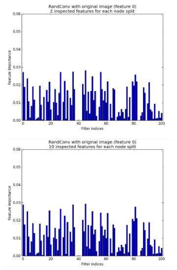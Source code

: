 \documentclass[a4paper]{report}
\begin{document}
	\begin{figure}
		\begin{subfigure}{.5\textwidth}
			\centering
			\includegraphics[width=1.\linewidth]{images/FInmin2.png}
			\caption{\label{fig:FInmin2}}
		\end{subfigure}%
		\begin{subfigure}{.5\textwidth}
			\centering
			\includegraphics[width=1.\linewidth]{images/FInmin10.png}
			\caption{\label{fig:FInmin10}}
		\end{subfigure}
		\begin{subfigure}{.5\textwidth}
			\centering

\end{subfigure}
\end{figure}
\end{document}
